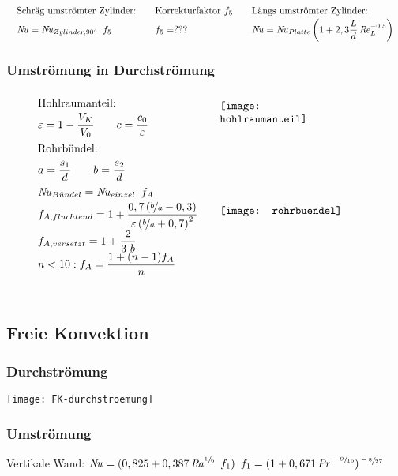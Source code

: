 	\setlength{\abovedisplayskip}{-10pt}
	\[ \arraycolsep=1em  \def\arraystretch{1.5}
	\begin{array}{lll}
		\text{Schräg umströmter Zylinder:}
			& \text{Korrekturfaktor } f_5
			& \text{Längs umströmter Zylinder:} \\
		 \Nuss = \Nuss_{Zylinder,\ang{90}} \ f_5
			&  f_5 = ???
			&  \Nuss =  \Nuss_{Platte}  \left(1+ 2,3 \dfrac{L}{d} \Reyn_L^{-0,5}\right)
	\end{array}\]

\subsubsection{Umströmung in Durchströmung}
		\setlength{\abovedisplayskip}{-20pt}
		\[ \arraycolsep=1em  \def\arraystretch{1.6}
		\begin{array}{ll}
			\text{Hohlraumanteil:} & \multirow{2}{0.19\textwidth}{\texttt{[image: hohlraumanteil]}}\\
			\varepsilon = 1- \dfrac{V_K}{V_0}  \qquad  c = \dfrac{c_0}{\varepsilon}  &\\
			\text{Rohrbündel:} & \multirow{7}{0.4\textwidth}{\texttt{[image: rohrbuendel]}}\\
		    a = \dfrac{s_1}{d}  \qquad  b = \dfrac{s_2}{d}  & \\
			\Nuss_{B\ue ndel} = \Nuss_{einzel}\ f_A & \\
			f_{A,fluchtend} = 1+ \dfrac{0,7 \left(\nicefrac{b}{a}-0,3\right)}{\varepsilon \left(\nicefrac{b}{a}+0,7\right)^2} &\\
			f_{A,versetzt} = 1 + \dfrac{2}{3\ b} & \\
			n < 10: f_A = \dfrac{1+ (n-1) f_A}{n} & \\
			&
		\end{array} \]

\clearpage
\subsection{Freie Konvektion}
\subsubsection{Durchströmung}
	\texttt{[image: FK-durchstroemung]}

\subsubsection{Umströmung}
	Vertikale Wand: $ \operatorname{\mathit{N\kern-.20em u}} = (0,825 + 0,387 \operatorname{\mathit{R\kern-.10em a}}^{\sfrac{1}{6}} \ f_1) $
		\qquad\qquad $ f_1 = (1 + 0,671 \operatorname{\mathit{P\kern-.10em r}}^{\sfrac{-9}{16}}) ^{\sfrac{-8}{27}} $

